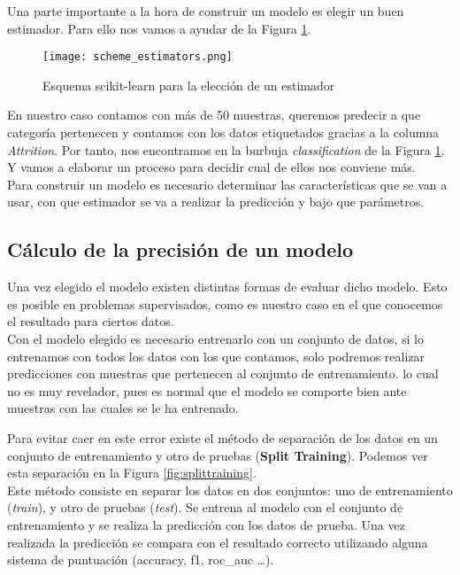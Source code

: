 Una parte importante a la hora de construir un modelo es elegir un buen estimador. Para ello nos vamos a ayudar de la Figura \ref{fig:scheme_estimators}.

\begin{figure}
	\centering
	\texttt{[image: scheme\_estimators.png]}
	\caption{Esquema scikit-learn para la elección de un estimador}
	\label{fig:scheme_estimators}
\end{figure}


En nuestro caso contamos con más de 50 muestras, queremos predecir a que categoría pertenecen y contamos con los datos etiquetados gracias a la columna \textit{Attrition}.
Por tanto, nos encontramos en la burbuja \textit{classification} de la Figura \ref{fig:scheme_estimators}.
Y vamos a elaborar un proceso para decidir cual de ellos nos conviene más.\\

Para construir un modelo es necesario determinar las características que se van a usar, con que estimador se va a realizar la predicción y bajo que parámetros.

\subsection{Cálculo de la precisión de un modelo}
Una vez elegido el modelo existen distintas formas de evaluar dicho modelo. Esto es posible en problemas supervisados, como es nuestro caso en el que conocemos el resultado para ciertos datos.\\

Con el modelo elegido es necesario entrenarlo con un conjunto de datos, si lo entrenamos con todos los datos con los que contamos, solo podremos realizar predicciones con muestras que pertenecen al conjunto de entrenamiento. lo cual no es muy revelador, pues es normal que el modelo se comporte bien ante muestras con las cuales se le ha entrenado.

Para evitar caer en este error existe el método de separación de los datos en un conjunto de entrenamiento y otro de pruebas (\textbf{Split Training}). Podemos ver esta separación en la Figura \ref{fig:splittraining}.\\

Este método consiste en separar los datos en dos conjuntos: uno de entrenamiento (\textit{train}), y otro de pruebas (\textit{test}).	
Se entrena al modelo con el conjunto de entrenamiento y se realiza la predicción con los datos de prueba. Una vez realizada la predicción se compara con el resultado correcto utilizando alguna sistema de puntuación (accuracy, f1, roc\_auc \ldots).



